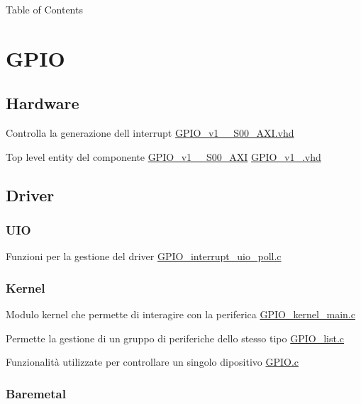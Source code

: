 \begin{DoxyParagraph}{Table of Contents}

\end{DoxyParagraph}
\hypertarget{index_GPIO}{}\section{G\+P\+IO}\label{index_GPIO}
\hypertarget{index_Hardware}{}\subsection{Hardware}\label{index_Hardware}

\begin{DoxyItemize}
\item Controlla la generazione dell\textquotesingle{} interrupt \hyperlink{GPIO__v1__0__S00__AXI_8vhd}{G\+P\+I\+O\+\_\+v1\+\_\+\_\+\+S00\+\_\+\+A\+X\+I.\+vhd}
\item Top level entity del componente \hyperlink{classGPIO__v1__0__S00__AXI}{G\+P\+I\+O\+\_\+v1\+\_\+\_\+\+S00\+\_\+\+A\+XI} \hyperlink{GPIO__v1__0_8vhd}{G\+P\+I\+O\+\_\+v1\+\_.\+vhd} 
\end{DoxyItemize}\hypertarget{index_Driver}{}\subsection{Driver}\label{index_Driver}
\hypertarget{index_UIO}{}\subsubsection{U\+IO}\label{index_UIO}

\begin{DoxyItemize}
\item Funzioni per la gestione del driver \hyperlink{GPIO__interrupt__uio__poll_8c}{G\+P\+I\+O\+\_\+interrupt\+\_\+uio\+\_\+poll.\+c} 
\end{DoxyItemize}\hypertarget{index_Kernel}{}\subsubsection{Kernel}\label{index_Kernel}

\begin{DoxyItemize}
\item Modulo kernel che permette di interagire con la periferica \hyperlink{GPIO__kernel__main_8c}{G\+P\+I\+O\+\_\+kernel\+\_\+main.\+c}
\item Permette la gestione di un gruppo di periferiche dello stesso tipo \hyperlink{GPIO__list_8c}{G\+P\+I\+O\+\_\+list.\+c}
\item Funzionalità utilizzate per controllare un singolo dipositivo \hyperlink{GPIO_8c}{G\+P\+I\+O.\+c} 
\end{DoxyItemize}\hypertarget{index_Baremetal}{}\subsubsection{Baremetal}\label{index_Baremetal}

